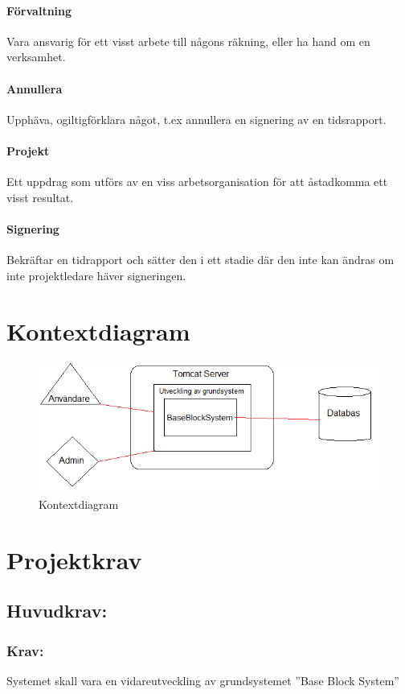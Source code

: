 \documentclass[paper=a4, fontsize=11pt,twoside]{article}
\begin{document}
\paragraph{Förvaltning}
\flushleft
Vara ansvarig för ett visst arbete till någons räkning, eller ha hand om en verksamhet.
\paragraph{Annullera}
\flushleft
Upphäva, ogiltigförklara något, t.ex annullera en signering av en tidsrapport.
\paragraph{Projekt}
\flushleft
Ett uppdrag som utförs av en viss arbetsorganisation för att åstadkomma ett visst resultat. 
\paragraph{Signering}
\flushleft
Bekräftar en tidrapport och sätter den i ett stadie där den inte kan ändras om inte projektledare häver signeringen.

\section{Kontextdiagram}
\begin{figure}[H]
\centering
\includegraphics[width = 12cm]{kontextdiagram_SRS.png}
\caption{Kontextdiagram}
\end{figure}

\section{Projektkrav}
\subsection{Huvudkrav:}
\subsubsection{Krav:}
Systemet skall vara en vidareutveckling av grundsystemet ''Base Block System''
\end{document}
